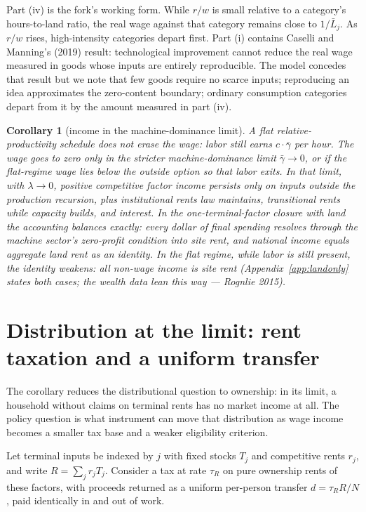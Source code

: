 \documentclass[12pt]{article}
\theoremstyle{plain}
\newtheorem*{corollary}{Corollary}
\begin{document}
Part (iv) is the fork's working form. While $r/w$ is small relative to a category's hours-to-land ratio, the real wage against that category remains close to $1/\bar{L}_j$. As $r/w$ rises, high-intensity categories depart first.  Part (i) contains Caselli and Manning's (2019) result: technological improvement cannot reduce the real wage measured in goods whose inputs are entirely reproducible. The model concedes that result but we note that few goods require no scarce inputs; reproducing an idea approximates the zero-content boundary; ordinary consumption categories depart from it by the amount measured in part (iv).

\begin{corollary}[income in the machine-dominance limit]
A flat relative-productivity schedule does not erase the wage: labor still earns $c\cdot\bar{\gamma}$ per hour. The wage goes to zero only in the stricter machine-dominance limit $\bar{\gamma}\to0$, or if the flat-regime wage lies below the outside option so that labor exits. In that limit, with $\lambda \to 0$, positive competitive factor income persists only on inputs outside the production recursion, plus institutional rents law maintains, transitional rents while capacity builds, and interest. In the one-terminal-factor closure with land the accounting balances exactly: every dollar of final spending resolves through the machine sector's zero-profit condition into site rent, and national income equals aggregate land rent as an identity. In the flat regime, while labor is still present, the identity weakens: all non-wage income is site rent (Appendix~\ref{app:landonly} states both cases; the wealth data lean this way --- Rognlie 2015).
\end{corollary}

\section{Distribution at the limit: rent taxation and a uniform transfer}\label{sec:fiscal}

The corollary reduces the distributional question to ownership: in its limit, a household without claims on terminal rents has no market income at all. The policy question is what instrument can move that distribution as wage income becomes a smaller tax base and a weaker eligibility criterion.

Let terminal inputs be indexed by $j$ with fixed stocks $T_j$ and competitive rents $r_j$, and write $R = \sum _j r_j T_j$. Consider a tax at rate $\tau _R$ on pure ownership rents of these factors, with proceeds returned as a uniform per-person transfer $d = \tau _R R/N$, paid identically in and out of work.
\end{document}
